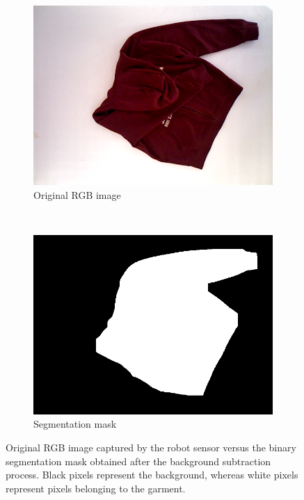 \begin{figure}[htbp]
	\centering
    \begin{subfigure}[l]{0.49\textwidth}
	    \centering
    	\includegraphics[width=\textwidth]
    	{figures/segmentation_original.png}
    	\caption{Original RGB image}
	\end{subfigure}
	~
    \begin{subfigure}[r]{0.49\textwidth}
	    \centering
    	\includegraphics[width=\textwidth]
    	{figures/segmentation_mask.png}
    	\caption{Segmentation mask}
	\end{subfigure} 
    \caption[Original RGB image captured by the robot sensor versus the binary segmentation mask obtained after the background subtraction process.]
    {Original RGB image captured by the robot sensor versus the binary segmentation mask obtained after the background subtraction process. Black pixels represent the background, whereas white pixels represent pixels belonging to the garment.}
    \label{fig:segmentation_mask}
\end{figure}



